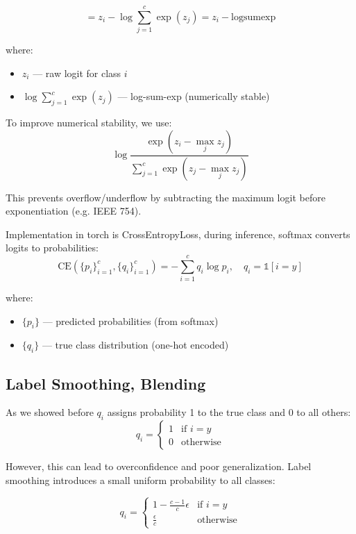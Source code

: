 \documentclass[12pt]{article}
\begin{document}
$$= z_i - \log \sum_{j=1}^{c} \exp(z_j) = z_i - \text{logsumexp}$$

where:
\begin{itemize}
  \item $z_i$ — raw logit for class $i$
  \item $\log \sum_{j=1}^{c} \exp(z_j)$ — log-sum-exp (numerically stable)
\end{itemize}

To improve numerical stability, we use:
$$\log \frac{\exp(z_i - \max_j z_j)}{\sum_{j=1}^{c} \exp(z_j - \max_j z_j)}$$

This prevents overflow/underflow by subtracting the maximum logit before exponentiation (e.g. IEEE 754).

Implementation in torch is CrossEntropyLoss, during inference, softmax converts logits to probabilities:
$$\text{CE}(\{p_i\}_{i=1}^{c}, \{q_i\}_{i=1}^{c}) = -\sum_{i=1}^{c} q_i \log p_i, \quad q_i = \mathbb{1}[i=y] $$

where:
\begin{itemize}
  \item $\{p_i\}$ — predicted probabilities (from softmax)
  \item $\{q_i\}$ — true class distribution (one-hot encoded)
\end{itemize}




\subsection{Label Smoothing, Blending}
As we showed before $q_i$ assigns probability 1 to the true class and 0 to all others:
$$q_i = \begin{cases} 1 & \text{if } i = y \\ 0 & \text{otherwise} \end{cases}$$

However, this can lead to overconfidence and poor generalization. Label smoothing introduces a small uniform probability to all classes:

$$q_i = \begin{cases} 1 - \frac{c-1}{c}\epsilon & \text{if } i = y \\ \frac{\epsilon}{c} & \text{otherwise} \end{cases}$$
\end{document}
